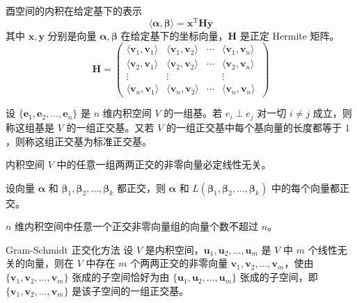 \begin{definition}
    酉空间的内积在给定基下的表示
    \[
        \langle \bm{\alpha}, \bm{\beta} \rangle = \bm{x}^{\mathrm{T}}\bm{H}\overline{\bm{y}}
    \]
    其中 $\bm{x}, \bm{y}$ 分别是向量 $\bm{\alpha}, \bm{\beta}$ 在给定基下的坐标向量，$\bm{H}$ 是正定 Hermite 矩阵。
    \[
        \bm{H} = \begin{pmatrix}
            \langle \bm{v}_1, \bm{v}_1 \rangle & \langle \bm{v}_1, \bm{v}_2 \rangle & \cdots & \langle \bm{v}_1, \bm{v}_n \rangle   \\
            \langle \bm{v}_2, \bm{v}_1 \rangle & \langle \bm{v}_2, \bm{v}_2 \rangle & \cdots & \langle \bm{v}_2, \bm{v}_n \rangle   \\
            \vdots                             & \vdots                             & \      & \vdots                               \\
            \langle \bm{v}_n, \bm{v}_1 \rangle & \langle \bm{v}_n, \bm{v}_2 \rangle & \cdots & \langle \bm{v}_n, \bm{v}_n \rangle \
        \end{pmatrix}
    \]
\end{definition}

\begin{definition}
    设 $\{\bm{e}_{1}, \bm{e}_{2}, \ldots, \bm{e}_{n}\}$ 是 $n$ 维内积空间 $V$ 的一组基。若 $e_{i} \perp e_{j}$ 对一切 $i \neq j$ 成立，则称这组基是 $V$ 的一组正交基。又若 $V$ 的一组正交基中每个基向量的长度都等于 $1$，则称这组正交基为标准正交基。
\end{definition}

\begin{lemma}
    内积空间 $V$ 中的任意一组两两正交的非零向量必定线性无关。
\end{lemma}

\begin{lemma}
    设向量 $\bm{\alpha}$ 和 $\bm{\beta}_1, \bm{\beta}_2, \ldots, \bm{\beta}_k$ 都正交，则 $\bm{\alpha}$ 和 $L(\bm{\beta}_1, \bm{\beta}_2, \ldots, \bm{\beta}_k)$ 中的每个向量都正交。
\end{lemma}

\begin{corollary}
    $n$ 维内积空间中任意一个正交非零向量组的向量个数不超过 $n$。
\end{corollary}

\begin{theorem}{Gram-Schmidt 正交化方法}
    设 $V$ 是内积空间，$\bm{u}_1, \bm{u}_2, \ldots, \bm{u}_m$ 是 $V$ 中 $m$ 个线性无关的向量，则在 $V$ 中存在 $m$ 个两两正交的非零向量 $\bm{v}_1, \bm{v}_2, \ldots,\bm{v}_m$，使由 $\{\bm{v}_1, \bm{v}_2, \ldots,\bm{v}_m\}$ 张成的子空间恰好为由 $\{\bm{u}_1, \bm{u}_2, \ldots, \bm{u}_m\}$ 张成的子空间，即 $\{\bm{v}_1, \bm{v}_2, \ldots,\bm{v}_m\}$ 是该子空间的一组正交基。
\end{theorem}

